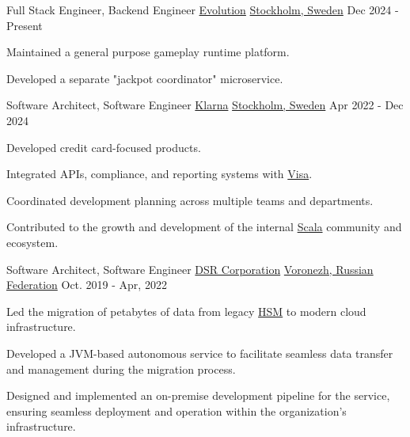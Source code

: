 
\begin{cventries}

	\cventry
	{Full Stack Engineer, Backend Engineer}
	{\href{https://www.linkedin.com/company/evolution-global}{Evolution}}
	{\href{https://www.google.com/maps/place/Stockholm}{Stockholm, Sweden}}
	{Dec 2024 - Present}
	{
		\begin{cvitems}
			\item {Maintained a general purpose gameplay runtime platform.}
			\item {Developed a separate "jackpot coordinator" microservice.}
		\end{cvitems}
	}


	\cventry
	{Software Architect, Software Engineer}
	{\href{https://www.linkedin.com/company/klarna/}{Klarna}}
	{\href{https://www.google.com/maps/place/Stockholm}{Stockholm, Sweden}}
	{Apr 2022 - Dec 2024}
	{
		\begin{cvitems}
			\item {Developed credit card-focused products.}
			\item {Integrated APIs, compliance, and reporting systems with  \href{https://www.linkedin.com/company/visa/}{Visa}.}
			\item {Coordinated development planning across multiple teams and departments.}
			\item {Contributed to the growth and development of the internal \href{https://en.wikipedia.org/wiki/Scala_(programming_language)}{Scala} community and ecosystem.}
		\end{cvitems}
	}


	\cventry
	{Software Architect, Software Engineer}
	{\href{https://www.linkedin.com/company/dsr-corporation/}{DSR Corporation}}
	{\href{https://www.google.com/maps/place/Voronezh,+Voronezh+Oblast,+Russia}{Voronezh, Russian Federation}}
	{Oct. 2019 - Apr, 2022}
	{
		\begin{cvitems}
			\item {Led the migration of petabytes of data from legacy \href{https://en.wikipedia.org/wiki/Hierarchical_storage_management}{HSM} to modern cloud infrastructure.}
			\item {Developed a JVM-based autonomous service to facilitate seamless data transfer and management during the migration process.}
			\item {Designed and implemented an on-premise development pipeline for the service, ensuring seamless deployment and operation within the organization's infrastructure.}
		\end{cvitems}
	}


\end{cventries}
